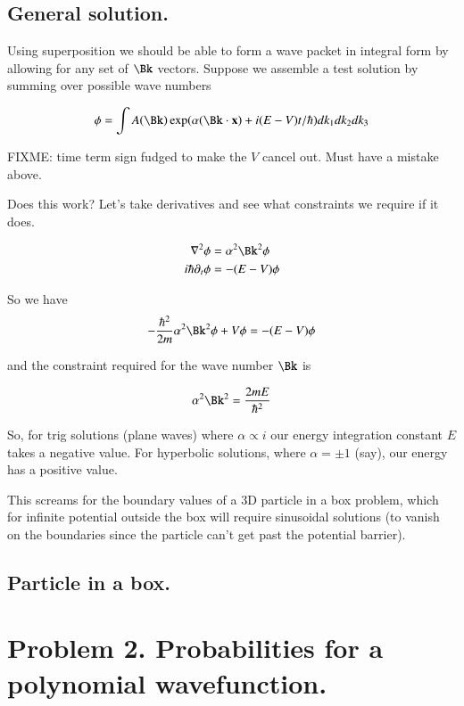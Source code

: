 \documentclass{article}
\begin{document}
\subsection{ General solution. }

Using superposition we should be able to form a wave packet in integral form
by allowing for any set of $\Bk$ vectors.  Suppose we assemble a test solution by summing over possible wave numbers

\begin{align*}
\phi = \int A(\Bk) \exp(\alpha(\Bk \cdot \Bx) + i(E - V) t/\hbar) dk_1 dk_2 dk_3 \\
\end{align*}

FIXME: time term sign fudged to make the $V$ cancel out.  Must have a mistake above.

Does this work?  Let's take derivatives and see what constraints we require if it does.

\begin{align*}
\grad^2 \phi &= \alpha^2 \Bk^2 \phi \\
i \hbar \partial_t \phi &= -(E - V) \phi
\end{align*}

So we have
\begin{align*}
-\frac{\hbar^2}{2m} \alpha^2 \Bk^2 \phi + V\phi = -(E-V) \phi
\end{align*}

and the constraint required for the wave number $\Bk$ is 

\begin{align*}
\alpha^2 \Bk^2 = \frac{2 m E }{\hbar^2}
\end{align*}

So, for trig solutions (plane waves) where $\alpha \propto i$ our energy integration constant $E$ takes a negative value.
For hyperbolic solutions, where $\alpha = \pm 1$ (say), our energy has a positive value.

This screams for the boundary values of a 3D particle in a box problem, which for infinite potential outside the
box will require sinusoidal solutions (to vanish on the boundaries since the particle can't get past the potential
barrier).

\subsection{ Particle in a box. }

\section{ Problem 2. Probabilities for a polynomial wavefunction. }
\end{document}
